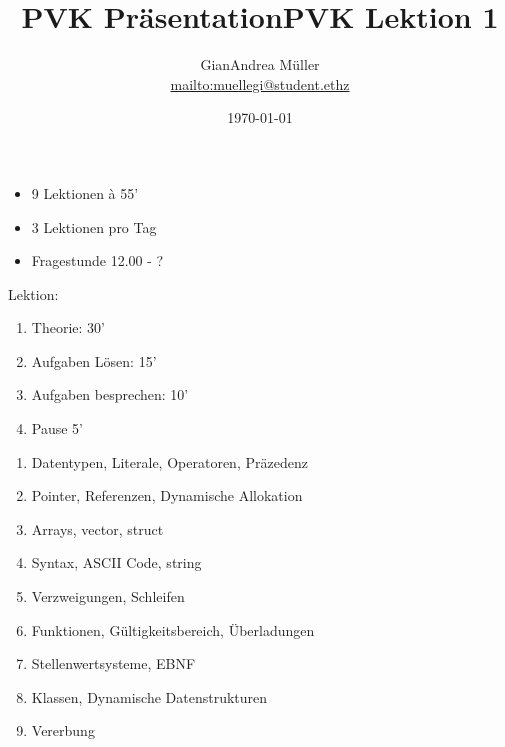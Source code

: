 \ifnum\conditionmacro=1 \documentclass[handout,usenames,dvipsnames]{beamer}\fi
\title{PVK Präsentation}
\author{GianAndrea Müller\\ \url{mailto:muellegi@student.ethz}}
\date{\today}
\begin{document}
\maketitle

\begin{TFTwoColumns}[Aufbau]
{
\begin{itemize}
\item 9 Lektionen à 55'
\item 3 Lektionen pro Tag
\item Fragestunde 12.00 - ?
\end{itemize}
Lektion:
\begin{enumerate}
\item Theorie: 30'
\item Aufgaben Lösen: 15'
\item Aufgaben besprechen: 10'
\item Pause 5'
\end{enumerate}
}
{
\begin{enumerate}
\item Datentypen, Literale, Operatoren, Präzedenz
\item Pointer, Referenzen, Dynamische Allokation
\item Arrays, vector, struct
\item Syntax, ASCII Code, string
\item Verzweigungen, Schleifen
\item Funktionen, Gültigkeitsbereich, Überladungen
\item Stellenwertsysteme, EBNF
\item Klassen, Dynamische Datenstrukturen
\item Vererbung
\end{enumerate}
}
\end{TFTwoColumns}


\title{PVK Lektion 1}

\maketitle
\end{document}
